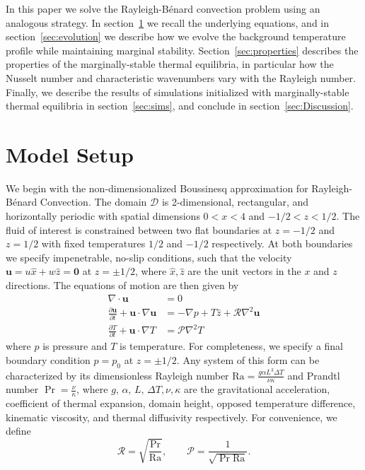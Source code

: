 \documentclass[reprint,amsmath,amssymb,aps]{revtex4-1}
\newcommand\Ra{\mathrm{Ra}}
\renewcommand{\vec}[1]{\boldsymbol{#1}}
\begin{document}
In this paper we solve the Rayleigh-B\'{e}nard convection problem using an analogous strategy.
In section~\ref{sec:model} we recall the underlying equations, and in section~\ref{sec:evolution} we describe how we evolve the background temperature profile while maintaining marginal stability.
Section~\ref{sec:properties} describes the properties of the marginally-stable thermal equilibria, in particular how the Nusselt number and characteristic wavenumbers vary with the Rayleigh number.
Finally, we describe the results of simulations initialized with marginally-stable thermal equilibria in section~\ref{sec:sims}, and conclude in section~\ref{sec:Discussion}.
 
\section{Model Setup}\label{sec:model}
We begin with the non-dimensionalized Boussinesq approximation for Rayleigh-Bénard Convection. 
The domain $\mathcal{D}$ is 2-dimensional, rectangular, and horizontally periodic with spatial dimensions $0 < x < 4$ and $-1/2 < z < 1/2$. 
The fluid of interest is constrained between two flat boundaries at $z = -1/2$ and $z = 1/2$ with fixed temperatures $1/2$ and $-1/2$ respectively. 
At both boundaries we specify impenetrable, no-slip conditions, such that the velocity $\vec{u} = u \hat{x} + w \hat{z} = \vec{0}$ at $z = \pm 1/2$, where $\hat{x}, \hat{z}$ are the unit vectors in the $x$ and $z$ directions. 
The equations of motion are then given by
\begin{align}
    \nabla \cdot \vec{u} &= 0 \label{EQ:motion1}\\
    \frac{\partial \vec{u}}{\partial t} + \vec{u} \cdot \nabla \vec{u} &= - \nabla p + T \hat{z} + \mathcal{R} \nabla^2 \vec{u} \label{EQ:motion2}\\
    \frac{\partial T}{\partial t} + \vec{u} \cdot \nabla T &= \mathcal{P} \nabla^2 T \label{EQ:motion3}
\end{align}
where $p$ is pressure and $T$ is temperature. 
For completeness, we specify a final boundary condition $p = p_0$ at $z = \pm 1/2$. 
Any system of this form can be characterized by its dimensionless Rayleigh number $\Ra = \frac{g\alpha L^3 \Delta T}{\nu \kappa}$ and Prandtl number $\Pr = \frac{\nu}{\kappa}$, where $g, \, \alpha, \, L, \, \Delta T, \nu, \kappa$ are the gravitational acceleration, coefficient of thermal expansion, domain height, opposed temperature difference, kinematic viscosity, and thermal diffusivity respectively. For convenience, we define
\begin{equation}
\mathcal{R} = \sqrt{\frac{\Pr}{\Ra}}, \qquad \mathcal{P} = \frac{1}{\sqrt{\Pr \Ra}}.
\end{equation}
\end{document}
